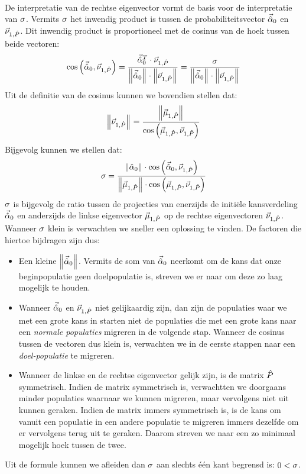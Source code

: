 \paragraph{}
De interpretatie van de rechtse eigenvector vormt de basis voor de interpretatie van $\metapa$. Vermits $\metapa$ het inwendig product is tussen de probabiliteitsvector $\probdistnormmeta{0}$ en $\evr[1,\removmat]$. Dit inwendig product is proportioneel met de cosinus van de hoek tussen beide vectoren:
\begin{equation}
\fun{\cos}{\probdistnormmeta{0},\evr[1,\removmat]}=\displaystyle\frac{\probdistnormmeta{0}^T\cdot\evr[1,\removmat]}{\dabs{\probdistnormmeta{0}}\cdot\dabs{\evr[1,\removmat]}}=\displaystyle\frac{\metapa}{\dabs{\probdistnormmeta{0}}\cdot\dabs{\evr[1,\removmat]}}
\end{equation}
Uit de definitie van de cosinus kunnen we bovendien stellen dat:
\begin{equation}
\dabs{\evr[1,\removmat]}=\displaystyle\frac{\dabs{\evl[1,\removmat]}}{\fun{\cos}{\evl[1,\removmat],\evr[1,\removmat]}}
\end{equation}
Bijgevolg kunnen we stellen dat:
\begin{equation}
\metapa=\displaystyle\frac{\dabs{\hat{\alpha}_0}\cdot\fun{\cos}{\probdistnormmeta{0},\evr[1,\removmat]}}{\dabs{\evl[1,\removmat]}\cdot\fun{\cos}{\evl[1,\removmat],\evr[1,\removmat]}}
\eqnlab{sigmaMeaning}
\end{equation}
$\metapa$ is bijgevolg de ratio tussen de projecties van enerzijds de initi\"ele kansverdeling $\probdistnormmeta{0}$ en anderzijds de linkse eigenvector $\evl[1,\removmat]$ op de rechtse eigenvectoren $\evr[1,\removmat]$. Wanneer $\metapa$ klein is verwachten we sneller een oplossing te vinden. De factoren die hiertoe bijdragen zijn dus:
\begin{itemize}
 \item Een kleine $\dabs{\probdistnormmeta{0}}$. Vermits de som van $\probdistnormmeta{0}$ neerkomt om de kans dat onze beginpopulatie geen doelpopulatie is, streven we er naar om deze zo laag mogelijk te houden.
 \item Wanneer $\probdistnormmeta{0}$ en $\evr[1,\removmat]$ niet gelijkaardig zijn, dan zijn de populaties waar we met een grote kans in starten niet de populaties die met een grote kans naar een \emph{normale populaties} migreren in de volgende stap. Wanneer de cosinus tussen de vectoren dus klein is, verwachten we in de eerste stappen naar een \emph{doel-populatie} te migreren.
 \item Wanneer de linkse en de rechtse eigenvector gelijk zijn, is de matrix $\removmat$ symmetrisch. Indien de matrix symmetrisch is, verwachtten we doorgaans minder populaties waarnaar we kunnen migreren, maar vervolgens niet uit kunnen geraken. Indien de matrix immers symmetrisch is, is de kans om vanuit een populatie in een andere populatie te migreren immers dezelfde om er vervolgens terug uit te geraken. Daarom streven we naar een zo minimaal mogelijk hoek tussen de twee.
\end{itemize}
Uit de formule kunnen we afleiden dan $\metapa$ aan slechts \'e\'en kant begrensd is: $0<\metapa$.

